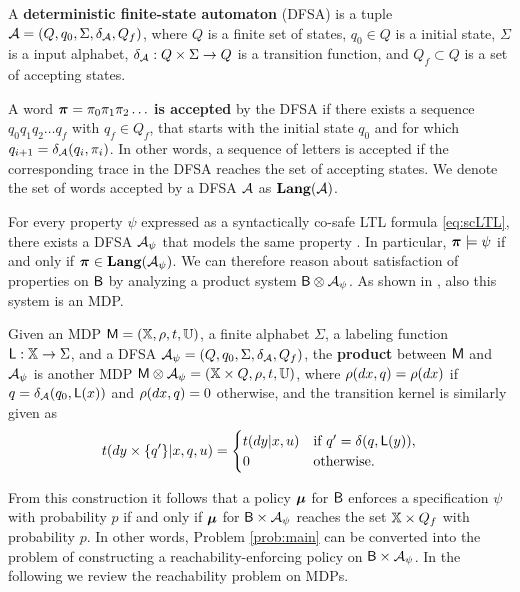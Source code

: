 \documentclass{ifacconf}
\begin{document}
\begin{definition}
  A \textbf{deterministic finite-state automaton} (DFSA) is a tuple $\mathcal{A} = (Q, q_0, \Sigma, \delta_{\mathcal{A}}, Q_f)$, where $Q$ is a finite set of states, $q_0 \in Q$ is a initial state, $\Sigma$ is a input alphabet, $\delta_{\mathcal{A}} : Q \times \Sigma \rightarrow Q$ is a transition function, and $Q_f\subset Q$ is a set of accepting states.

  A word ${\boldsymbol{\pi}} = \pi_0 \pi_1 \pi_2 \ldots$ \textbf{is accepted} by the DFSA if there exists a sequence $q_0 q_1 q_2 \ldots q_f$ with $q_f\in Q_f$, that starts with the initial state $q_0$ and for which $q_{i+1}=\delta_{\mathcal{A}}(q_i,\pi_i)$. In other words, a sequence of letters is accepted if the corresponding trace in the DFSA reaches the set of accepting states. We denote the set of words accepted by a DFSA $\mathcal{A}$ as $\mathbf{Lang} (\mathcal A)$.
\end{definition}

For every property $\psi$ expressed as a syntactically co-safe LTL formula \eqref{eq:scLTL}, there exists a DFSA  $\mathcal{A}_\psi$ that models the same property \citep{Belta2017}. In particular, ${\boldsymbol{\pi}}\models\psi$ if and only if ${\boldsymbol{\pi}}\in \mathbf{Lang}(\mathcal{A}_\psi)$. We can therefore reason about satisfaction of properties on $\mathsf{B}$ by analyzing a product system $\mathsf{B} \otimes \mathcal{A}_\psi$. As shown in \citep{tmka2013}, also this system is an MDP.

\begin{definition}
\label{def:product}
  Given an MDP $\mathsf{M} = ({\mathbb{X}}, \rho, t, {\mathbb{U}})$, a finite alphabet $\Sigma$, a labeling function $\mathsf{L} : {\mathbb{X}}\rightarrow\Sigma$, and a DFSA  $\mathcal{A}_\psi = (Q, q_0, \Sigma, \delta_{\mathcal{A}}, Q_f)$, the \textbf{product} between $\mathsf{M}$ and $\mathcal{A}_\psi$ is another MDP $\mathsf{M}\otimes\mathcal{A}_\psi = ({\mathbb{X}} \times Q, \relax\rho, \relax{t}, {\mathbb{U}})$, where $\relax\rho(dx,q) = \rho(dx)$ if $q= \delta_{\mathcal{A}}(q_0,\mathsf L(x))$ and $ \relax\rho(dx,q) =0$ otherwise, and the transition kernel is similarly given as
  \begin{equation*}
    \relax{t}(d y\times\{q'\}|x,q,u) = \begin{cases}t(dy|x,u)& \text{if } q' =\delta(q,\mathsf{L}(y)),\\ 0 & \text{otherwise.}  \end{cases}
  \end{equation*}
\end{definition}

From this construction it follows that a policy ${\boldsymbol{\mu}}$ for $\mathsf{B}$ enforces a specification $\psi$ with probability $p$ if and only if ${\boldsymbol{\mu}}$ for $\mathsf{B} \times \mathcal{A}_\psi$ reaches the set ${\mathbb{X}} \times Q_f$ with probability $p$. In other words, Problem \ref{prob:main} can be converted into the problem of constructing a reachability-enforcing policy on $\mathsf{B} \times \mathcal{A}_\psi$. In the following we review the reachability problem on MDPs.
\end{document}
